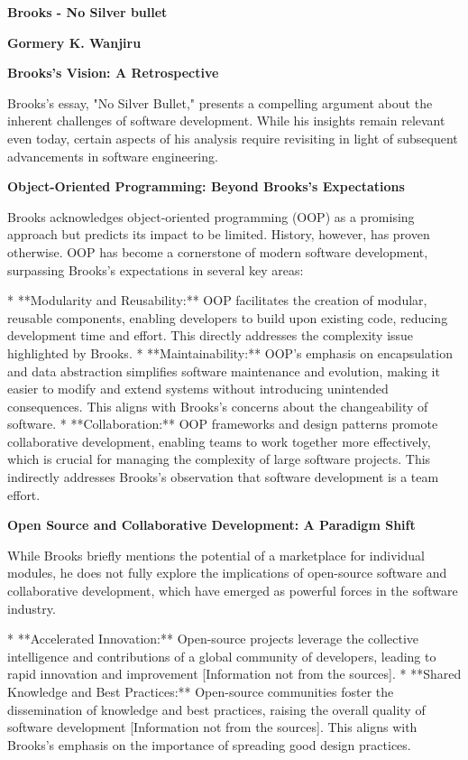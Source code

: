 \documentclass[a4paper, 12pt]{article}
\begin{document}
\noindent
\textbf{Brooks - No Silver bullet}

\vspace{0.5cm}

\textbf{Gormery K. Wanjiru}

\vspace{0.5cm}
\textbf{Brooks's Vision: A Retrospective}

Brooks's essay, "No Silver Bullet," presents a compelling argument about the inherent challenges of software development. While his insights remain relevant even today, certain aspects of his analysis require revisiting in light of subsequent advancements in software engineering.

\textbf{Object-Oriented Programming: Beyond Brooks's Expectations}

Brooks acknowledges object-oriented programming (OOP) as a promising approach but predicts its impact to be limited. History, however, has proven otherwise. OOP has become a cornerstone of modern software development, surpassing Brooks's expectations in several key areas:

*   **Modularity and Reusability:** OOP facilitates the creation of modular, reusable components, enabling developers to build upon existing code, reducing development time and effort. This directly addresses the complexity issue highlighted by Brooks.
*   **Maintainability:** OOP's emphasis on encapsulation and data abstraction simplifies software maintenance and evolution, making it easier to modify and extend systems without introducing unintended consequences. This aligns with Brooks's concerns about the changeability of software.
*   **Collaboration:** OOP frameworks and design patterns promote collaborative development, enabling teams to work together more effectively, which is crucial for managing the complexity of large software projects. This indirectly addresses Brooks's observation that software development is a team effort.

\textbf{Open Source and Collaborative Development: A Paradigm Shift}

While Brooks briefly mentions the potential of a marketplace for individual modules, he does not fully explore the implications of open-source software and collaborative development, which have emerged as powerful forces in the software industry. 

*   **Accelerated Innovation:** Open-source projects leverage the collective intelligence and contributions of a global community of developers, leading to rapid innovation and improvement [Information not from the sources].
*   **Shared Knowledge and Best Practices:** Open-source communities foster the dissemination of knowledge and best practices, raising the overall quality of software development [Information not from the sources]. This aligns with Brooks's emphasis on the importance of spreading good design practices.
\end{document}
